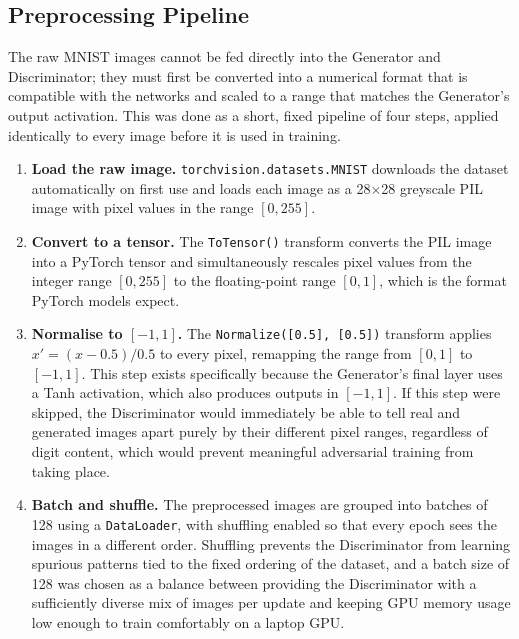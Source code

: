 \documentclass[12pt,a4paper]{article}
\begin{document}
\subsection{Preprocessing Pipeline}

The raw MNIST images cannot be fed directly into the Generator and Discriminator; they
must first be converted into a numerical format that is compatible with the networks and
scaled to a range that matches the Generator's output activation. This was done as a
short, fixed pipeline of four steps, applied identically to every image before it is
used in training.

\begin{enumerate}
    \item \textbf{Load the raw image.} \texttt{torchvision.datasets.MNIST} downloads the
          dataset automatically on first use and loads each image as a
          28$\times$28 greyscale PIL image with pixel values in the range $[0, 255]$.
    \item \textbf{Convert to a tensor.} The \texttt{ToTensor()} transform converts the
          PIL image into a PyTorch tensor and simultaneously rescales pixel values from
          the integer range $[0, 255]$ to the floating-point range $[0, 1]$, which is the
          format PyTorch models expect.
    \item \textbf{Normalise to $[-1, 1]$.} The \texttt{Normalize([0.5], [0.5])} transform
          applies $x' = (x - 0.5) / 0.5$ to every pixel, remapping the range from
          $[0, 1]$ to $[-1, 1]$. This step exists specifically because the Generator's
          final layer uses a Tanh activation, which also produces outputs in
          $[-1, 1]$. If this step were skipped, the Discriminator would immediately be
          able to tell real and generated images apart purely by their different pixel
          ranges, regardless of digit content, which would prevent meaningful adversarial
          training from taking place.
    \item \textbf{Batch and shuffle.} The preprocessed images are grouped into batches of
          128 using a \texttt{DataLoader}, with shuffling enabled so that every epoch
          sees the images in a different order. Shuffling prevents the Discriminator from
          learning spurious patterns tied to the fixed ordering of the dataset, and a
          batch size of 128 was chosen as a balance between providing the Discriminator
          with a sufficiently diverse mix of images per update and keeping GPU memory
          usage low enough to train comfortably on a laptop GPU.
\end{enumerate}
\end{document}
